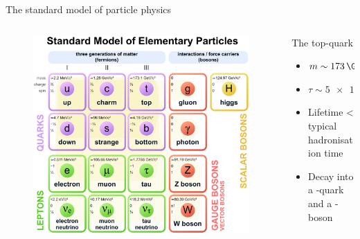 \begin{frame}{The standard model of particle physics}
\begin{columns}
\begin{column}{0.6\textwidth}
\begin{figure}
    \centering
    \includegraphics[scale=0.17]{Standard_Model_of_Elementary_Particles.eps}
    \caption{\cite{standard_model}}
    \label{fig:my_label}
\end{figure}
\end{column}
\pause
\begin{column}{0.4\textwidth}
\begin{block}{The top-quark}
        \begin{itemize}
            \item $ m \sim \SI{173}{\GeVovercsq}$
            \vspace{0.2cm}
            \item $\tau \sim \SI{5e-25}{\second}$
            \vspace{0.2cm}
            \item Lifetime < typical hadronisation time 
            \vspace{0.2cm}
            \item Decay into a \Pbottom-quark and a \PW-boson
        \end{itemize}
\end{block}
\end{column}
\end{columns}

\end{frame}

